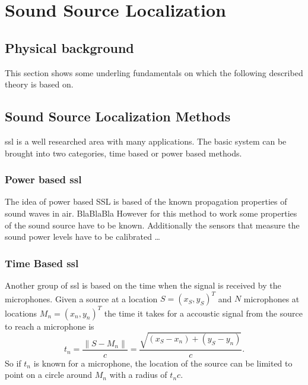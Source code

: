 \graphicspath{ {images/2_source_localization/} }
\chapter{Sound Source Localization}
\section{Physical background}
This section shows some underling fundamentals on which the following described theory is based on.

\section{Sound Source Localization Methods}
\acrfull{ssl}  is a well researched area with many applications.
\cite{nat_skript}
The basic system can be brought into two categories, time based or power based methods.
\subsection{Power based \acrshort{ssl}}
The idea of power based SSL is based of the known propagation properties of sound waves in air.
BlaBlaBla 
However for this method to work some properties of the sound source have to be known.
Additionally the sensors that measure the sound power levels have to be calibrated \dots 

\subsection{Time Based \acrshort{ssl}}
Another group of \acrshort*{ssl} is based on the time when the
signal is received by the microphones.
Given a source at a location $S = (x_S,y_S)^T$ and $N$ microphones at locations 
$M_n = (x_n,y_n)^T$ the time it takes for a accoustic signal from the source to reach a microphone is 
\begin{equation}
    t_n = \frac{\lVert S - M_n\rVert}{c} 
        = \frac{\sqrt{\left(x_S - x_n\right) + \left(y_S - y_n\right)}}{c} .
\end{equation}
So if $t_n$ is known for a microphone, the location of the source can be limited to point on a circle
around $M_n$ with a radius of $t_n c$.

